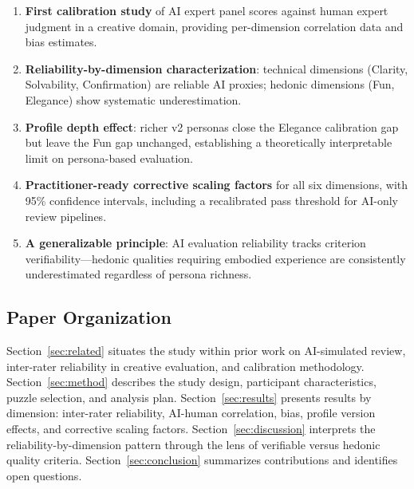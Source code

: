 \begin{enumerate}
  \item \textbf{First calibration study} of AI expert panel scores against human expert judgment in a creative domain, providing per-dimension correlation data and bias estimates.
  \item \textbf{Reliability-by-dimension characterization}: technical dimensions (Clarity, Solvability, Confirmation) are reliable AI proxies; hedonic dimensions (Fun, Elegance) show systematic underestimation.
  \item \textbf{Profile depth effect}: richer v2 personas close the Elegance calibration gap but leave the Fun gap unchanged, establishing a theoretically interpretable limit on persona-based evaluation.
  \item \textbf{Practitioner-ready corrective scaling factors} for all six dimensions, with 95\% confidence intervals, including a recalibrated pass threshold for AI-only review pipelines.
  \item \textbf{A generalizable principle}: AI evaluation reliability tracks criterion verifiability---hedonic qualities requiring embodied experience are consistently underestimated regardless of persona richness.
\end{enumerate}

\subsection*{Paper Organization}

Section~\ref{sec:related} situates the study within prior work on AI-simulated review, inter-rater reliability in creative evaluation, and calibration methodology. Section~\ref{sec:method} describes the study design, participant characteristics, puzzle selection, and analysis plan. Section~\ref{sec:results} presents results by dimension: inter-rater reliability, AI-human correlation, bias, profile version effects, and corrective scaling factors. Section~\ref{sec:discussion} interprets the reliability-by-dimension pattern through the lens of verifiable versus hedonic quality criteria. Section~\ref{sec:conclusion} summarizes contributions and identifies open questions.
